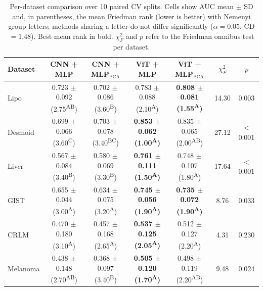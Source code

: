 \begin{table}[t]
\centering
\small
\setlength{\tabcolsep}{4pt}
\begin{tabular}{lcccccc}
\toprule
Dataset & CNN + MLP & CNN + MLP$_\text{PCA}$ & ViT + MLP & ViT + MLP$_\text{PCA}$ & $\chi^2_F$ & $p$ \\
\midrule
Lipo & 0.723 $\pm$ 0.092 (2.75\textsuperscript{AB}) & 0.702 $\pm$ 0.086 (3.60\textsuperscript{B}) & 0.783 $\pm$ 0.088 (2.10\textsuperscript{A}) & \textbf{0.808 $\pm$ 0.081 (1.55\textsuperscript{A})} & 14.30 & 0.003 \\
Desmoid & 0.699 $\pm$ 0.066 (3.60\textsuperscript{C}) & 0.703 $\pm$ 0.078 (3.40\textsuperscript{BC}) & \textbf{0.853 $\pm$ 0.062 (1.00\textsuperscript{A})} & 0.835 $\pm$ 0.065 (2.00\textsuperscript{AB}) & 27.12 & $<$0.001 \\
Liver & 0.567 $\pm$ 0.084 (3.40\textsuperscript{B}) & 0.580 $\pm$ 0.069 (3.30\textsuperscript{B}) & \textbf{0.761 $\pm$ 0.111 (1.50\textsuperscript{A})} & 0.748 $\pm$ 0.107 (1.80\textsuperscript{A}) & 17.64 & $<$0.001 \\
GIST & 0.655 $\pm$ 0.044 (3.00\textsuperscript{A}) & 0.634 $\pm$ 0.075 (3.20\textsuperscript{A}) & \textbf{0.745 $\pm$ 0.056 (1.90\textsuperscript{A})} & \textbf{0.735 $\pm$ 0.072 (1.90\textsuperscript{A})} & 8.76 & 0.033 \\
CRLM & 0.470 $\pm$ 0.180 (3.10\textsuperscript{A}) & 0.457 $\pm$ 0.168 (2.65\textsuperscript{A}) & \textbf{0.537 $\pm$ 0.125 (2.05\textsuperscript{A})} & 0.512 $\pm$ 0.127 (2.20\textsuperscript{A}) & 4.31 & 0.230 \\
Melanoma & 0.438 $\pm$ 0.148 (2.70\textsuperscript{AB}) & 0.368 $\pm$ 0.097 (3.40\textsuperscript{B}) & \textbf{0.505 $\pm$ 0.120 (1.70\textsuperscript{A})} & 0.498 $\pm$ 0.119 (2.20\textsuperscript{AB}) & 9.48 & 0.024 \\
\bottomrule
\end{tabular}
\caption{Per-dataset comparison over 10 paired CV splits. Cells show AUC mean $\pm$ SD and, in parentheses, the mean Friedman rank (lower is better) with Nemenyi group letters; methods sharing a letter do not differ significantly ($\alpha=0.05$, CD$=1.48$). Best mean rank in bold. $\chi^2_F$ and $p$ refer to the Friedman omnibus test per dataset.}
\label{tab:mlp_per_dataset_friedman}
\end{table}

